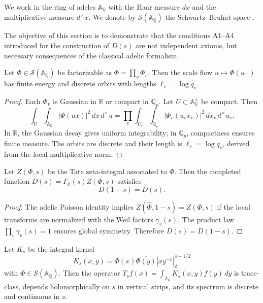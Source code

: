 We work in the ring of adeles $\mathbb{A}_\mathbb{Q}$ with the Haar measure
$dx$ and the multiplicative measure $d^{\times}x$. We denote by
$\mathcal{S}(\mathbb{A}_\mathbb{Q})$ the Schwartz--Bruhat space
\cite[Chap.~I]{tate1967}.

The objective of this section is to demonstrate that the conditions A1--A4 introduced
for the construction of $D(s)$ are not independent axioms, but necessary consequences
of the classical adelic formalism.

\begin{theorem}\label{thm:A1}
Let $\Phi\in\mathcal{S}(\mathbb{A}_\mathbb{Q})$ be factorizable as
$\Phi=\prod_v \Phi_v$.
Then the scale flow $u\mapsto \Phi(u\cdot)$ has finite energy and
discrete orbits with lengths $\ell_v = \log q_v$.
\end{theorem}

\begin{proof}
Each $\Phi_v$ is Gaussian in $\mathbb{R}$ or compact in $\mathbb{Q}_p$.
Let $U\subset \mathbb{A}_\mathbb{Q}^\times$ be compact. Then
\[
 \int_U \!\int_{\mathbb{A}_\mathbb{Q}} |\Phi(ux)|^2\,dx\,d^\times u
   = \prod_v \int_{U_v} \!\int_{\mathbb{Q}_v} |\Phi_v(u_v x_v)|^2\,dx_v\,d^\times u_v.
\]
In $\mathbb{R}$, the Gaussian decay gives uniform integrability;
in $\mathbb{Q}_p$, compactness ensures finite measure.
The orbits are discrete and their length is $\ell_v=\log q_v$, derived from the
local multiplicative norm.
\end{proof}

\begin{theorem}\label{thm:A2}
Let $Z(\Phi,s)$ be the Tate zeta-integral associated to $\Phi$.
Then the completed function
$D(s)=\Gamma_\mathbb{A}(s)Z(\Phi,s)$ satisfies
\[
 D(1-s)=D(s).
\]
\end{theorem}

\begin{proof}
The adelic Poisson identity
\cite[Thm.~2]{tate1967} implies
$Z(\widehat{\Phi},1-s)=Z(\Phi,s)$ if the local transforms are normalized with
the Weil factors $\gamma_v(s)$.
The product law $\prod_v \gamma_v(s)=1$ \cite[§II.3]{Weil1964}
ensures global symmetry.
Therefore $D(s)=D(1-s)$.
\end{proof}

\begin{theorem}\label{thm:A4}
Let $K_s$ be the integral kernel
\[
 K_s(x,y)=\Phi(x)\overline{\Phi(y)}|xy^{-1}|_\mathbb{A}^{s-1/2}
\]
with $\Phi\in\mathcal{S}(\mathbb{A}_\mathbb{Q})$.
Then the operator $T_s f(x)=\int_{\mathbb{A}_\mathbb{Q}} K_s(x,y)f(y)\,dy$
is trace-class, depends holomorphically on $s$ in vertical strips, and its spectrum
is discrete and continuous in $s$.
\end{theorem}

